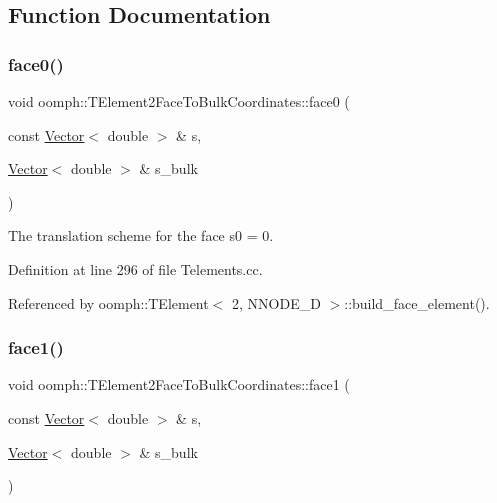 \subsection{Function Documentation}
\mbox{\label{namespaceoomph_1_1TElement2FaceToBulkCoordinates_ab280231d6d457a710b26ea8fa934e330}} 
\subsubsection{\texorpdfstring{face0()}{face0()}}
{\footnotesize\ttfamily void oomph\+::\+T\+Element2\+Face\+To\+Bulk\+Coordinates\+::face0 (\begin{DoxyParamCaption}\item[{const \hyperlink{classoomph_1_1Vector}{Vector}$<$ double $>$ \&}]{s,  }\item[{\hyperlink{classoomph_1_1Vector}{Vector}$<$ double $>$ \&}]{s\+\_\+bulk }\end{DoxyParamCaption})}



The translation scheme for the face s0 = 0. 



Definition at line 296 of file Telements.\+cc.



Referenced by oomph\+::\+T\+Element$<$ 2, N\+N\+O\+D\+E\+\_\+D $>$\+::build\+\_\+face\+\_\+element().

\mbox{\label{namespaceoomph_1_1TElement2FaceToBulkCoordinates_a66ea86f83fa5b215f4fa04b61d8f8ef4}} 
\subsubsection{\texorpdfstring{face1()}{face1()}}
{\footnotesize\ttfamily void oomph\+::\+T\+Element2\+Face\+To\+Bulk\+Coordinates\+::face1 (\begin{DoxyParamCaption}\item[{const \hyperlink{classoomph_1_1Vector}{Vector}$<$ double $>$ \&}]{s,  }\item[{\hyperlink{classoomph_1_1Vector}{Vector}$<$ double $>$ \&}]{s\+\_\+bulk }\end{DoxyParamCaption})}



